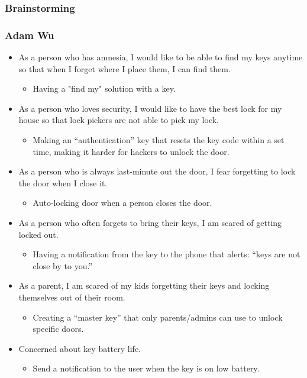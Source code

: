 
\subsubsection{Brainstorming} \label{Brainstorming}

\subsubsection*{Adam Wu}
\begin{itemize}
    \item As a person who has amnesia, I would like to be able to find my keys anytime so that when I forget where I place them, I can find them.
    \begin{itemize}
        \item Having a "find my" solution with a key.
    \end{itemize}
    \item As a person who loves security, I would like to have the best lock for my house so that lock pickers are not able to pick my lock.
    \begin{itemize}
        \item Making an “authentication” key that resets the key code within a set time, making it harder for hackers to unlock the door.
    \end{itemize}
    \item As a person who is always last-minute out the door, I fear forgetting to lock the door when I close it.
    \begin{itemize}
        \item Auto-locking door when a person closes the door.
    \end{itemize}
    \item As a person who often forgets to bring their keys, I am scared of getting locked out.
    \begin{itemize}
        \item Having a notification from the key to the phone that alerts: “keys are not close by to you.”
    \end{itemize}
    \item As a parent, I am scared of my kids forgetting their keys and locking themselves out of their room.
    \begin{itemize}
        \item Creating a “master key” that only parents/admins can use to unlock specific doors.
    \end{itemize}
    \item Concerned about key battery life.
    \begin{itemize}
        \item Send a notification to the user when the key is on low battery.
    \end{itemize}
\end{itemize}

